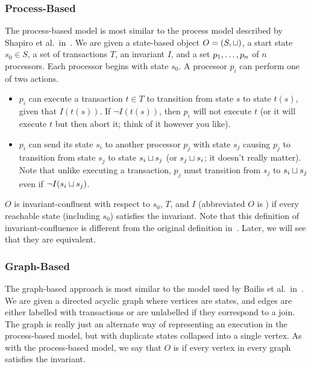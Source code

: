 

\subsubsection{Process-Based}
The process-based model is most similar to the process model described by
Shapiro et al.\ in~\cite{shapiro2011conflict}. We are given a state-based
object $O = (S, \sqcup)$, a start state $s_0 \in S$, a set of transactions $T$,
an invariant $I$, and a set ${p}_{1}, \ldots, {p}_{n}$ of $n$ processors. Each processor
begins with state $s_0$. A processor $p_i$ can perform one of two actions.

\begin{itemize}
  \item
    $p_i$ can execute a transaction $t \in T$ to transition from state $s$ to
    state $t(s)$, given that $I(t(s))$. If $\lnot I(t(s))$, then $p_i$ will not
    execute $t$ (or it will execute $t$ but then abort it; think of it however
    you like).

  \item
    $p_i$ can send its state $s_i$ to another processor $p_j$ with state $s_j$
    causing $p_j$ to transition from state $s_j$ to state $s_i \sqcup s_j$ (or
    $s_j \sqcup s_i$; it doesn't really matter). Note that unlike executing a
    transaction, $p_j$ must transition from $s_j$ to $s_i \sqcup s_j$ even if
    $\lnot I(s_i \sqcup s_j)$.
\end{itemize}

$O$ is invariant-confluent with respect to $s_0$, $T$, and $I$ (abbreviated $O$
is \sTIconfluent{}) if every reachable state (including $s_0$) satisfies the
invariant. Note that this definition of invariant-confluence is different from
the original definition in~\cite{bailis2014coordination}. Later, we will see
that they are equivalent.

\subsubsection{Graph-Based}
The graph-based approach is most similar to the model used by Bailis et al.\
in~\cite{bailis2014coordination}. We are given a directed acyclic graph where
vertices are states, and edges are either labelled with transactions or are
unlabelled if they correspond to a join. The graph is really just an alternate
way of representing an execution in the process-based model, but with duplicate
states collapsed into a single vertex. As with the process-based model, we say
that $O$ is \sTIconfluent{} if every vertex in every graph satisfies the
invariant.

